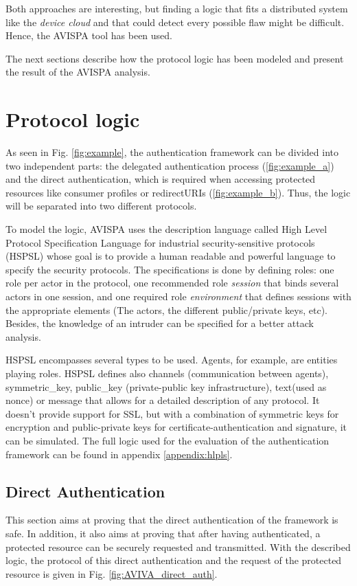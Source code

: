 Both approaches are interesting, but finding a logic that fits a distributed system like the \emph{device cloud} and that could detect every possible flaw might be difficult. Hence, the AVISPA tool has been used. 

The next sections describe how the protocol logic has been modeled and present the result of the AVISPA analysis.

\section{Protocol logic}
As seen in Fig. \ref{fig:example}, the authentication framework can be divided into two independent parts: the delegated authentication process (\ref{fig:example_a}) and the direct authentication, which is required when accessing protected resources like consumer profiles or redirectURIs (\ref{fig:example_b}). Thus, the logic will be separated into two different protocols.

To model the logic, AVISPA uses the description language called High Level Protocol Specification Language for industrial security-sensitive protocols (HSPSL) whose goal is to provide a human readable and powerful language to specify the security protocols. The specifications is done by defining roles: one role per actor in the protocol, one recommended role \textit{session} that binds several actors in one session, and one required role \textit{environment} that defines sessions with the appropriate elements (The actors, the different public/private keys, etc). Besides, the knowledge of an intruder can be specified for a better attack analysis.

HSPSL encompasses several types to be used. Agents, for example, are entities playing roles. HSPSL defines also channels (communication between agents), symmetric\_key, public\_key (private-public key infrastructure), text(used as nonce) or message that allows for a detailed description of any protocol. It doesn't provide support for SSL, but with a combination of symmetric keys for encryption and public-private keys for certificate-authentication and signature, it can be simulated. The full logic used for the evaluation of the authentication framework can be found in appendix \ref{appendix:hlpls}.

\subsection{Direct Authentication}

This section aims at proving that the direct authentication of the framework is safe. In addition, it also aims at proving that after having authenticated, a protected resource can be securely requested and transmitted. With the described logic, the protocol of this direct authentication and the request of the protected resource is given in Fig. \ref{fig:AVIVA_direct_auth}.

